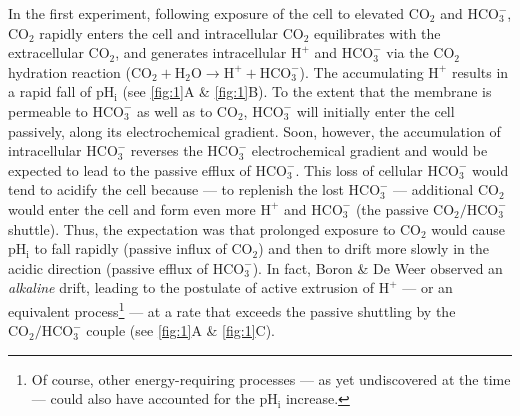 \documentclass[fleqn,10pt]{physiome}
\begin{document}
In the first experiment, following exposure of the cell to elevated $\mathrm{CO_2}$ and $\mathrm{HCO_3^-}$, $\mathrm{CO_2}$ rapidly enters the cell and intracellular $\mathrm{CO_2}$ equilibrates with the extracellular $\mathrm{CO_2}$, and generates intracellular $\mathrm{H^+}$ and $\mathrm{HCO_3^-}$ via the $\mathrm{CO_2}$ hydration reaction ($\mathrm{CO_2}+\mathrm{H_2O} \longrightarrow \mathrm{H^+}+\mathrm{HCO^-_3}$). The accumulating $\mathrm{H^+}$ results in a rapid fall of $\mathrm{pH_i}$ (see \autoref{fig:1}A \& \autoref{fig:1}B). To the extent that the membrane is permeable to $\mathrm{HCO_3^-}$ as well as to $\mathrm{CO_2}$, $\mathrm{HCO_3^-}$ will initially enter the cell passively, along its electrochemical gradient. Soon, however, the accumulation of intracellular $\mathrm{HCO_3^-}$ reverses the $\mathrm{HCO_3^-}$ electrochemical gradient and would be expected to lead to the passive efflux of $\mathrm{HCO_3^-}$. This loss of cellular $\mathrm{HCO_3^-}$ would tend to acidify the cell because --- to replenish the lost $\mathrm{HCO_3^-}$ --- additional $\mathrm{CO_2}$ would enter the cell and form even more $\mathrm{H^+}$ and $\mathrm{HCO_3^-}$ (the passive $\mathrm{CO_2}/\mathrm{HCO_3^-}$ shuttle). Thus, the expectation was that prolonged exposure to $\mathrm{CO_2}$ would cause $\mathrm{pH_i}$ to fall rapidly (passive influx of $\mathrm{CO_2}$) and then to drift more slowly in the acidic direction (passive efflux of $\mathrm{HCO_3^-}$). In fact, Boron \& De Weer observed an \textit{alkaline} drift, leading to the postulate of active extrusion of $\mathrm{H^+}$ --- or an equivalent process\footnote{Of course, other energy-requiring processes --- as yet undiscovered at the time --- could also have accounted for the $\mathrm{pH_i}$ increase.} --- at a rate that exceeds the passive shuttling by the $\mathrm{CO_2}/\mathrm{HCO_3^-}$ couple (see \autoref{fig:1}A \& \autoref{fig:1}C).
\end{document}
